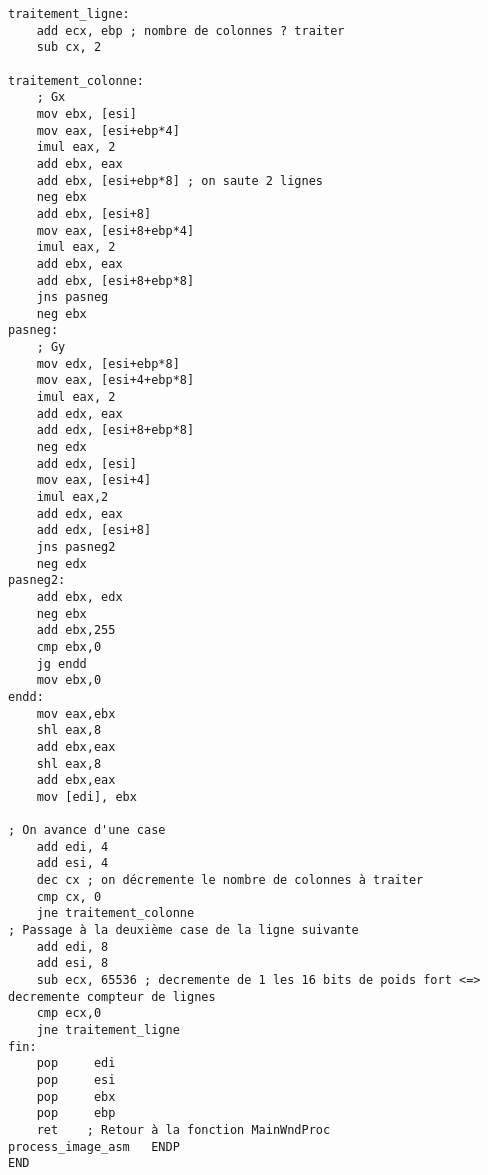 \begin{lstlisting}
traitement_ligne:
    add ecx, ebp ; nombre de colonnes ? traiter
    sub cx, 2

traitement_colonne:
    ; Gx 
    mov ebx, [esi]
    mov eax, [esi+ebp*4]
    imul eax, 2
    add ebx, eax
    add ebx, [esi+ebp*8] ; on saute 2 lignes
    neg ebx
    add ebx, [esi+8]
    mov eax, [esi+8+ebp*4]
    imul eax, 2
    add ebx, eax
    add ebx, [esi+8+ebp*8]
    jns pasneg
    neg ebx
pasneg:
    ; Gy
    mov edx, [esi+ebp*8]
    mov eax, [esi+4+ebp*8]
    imul eax, 2
    add edx, eax
    add edx, [esi+8+ebp*8]
    neg edx
    add edx, [esi]
    mov eax, [esi+4]
    imul eax,2
    add edx, eax
    add edx, [esi+8]
    jns pasneg2
    neg edx
pasneg2:
    add ebx, edx
    neg ebx
    add ebx,255
    cmp ebx,0
    jg endd
    mov ebx,0
endd:
    mov eax,ebx
    shl eax,8
    add ebx,eax
    shl eax,8
    add ebx,eax
    mov [edi], ebx

; On avance d'une case
    add edi, 4
    add esi, 4
    dec cx ; on décremente le nombre de colonnes à traiter
    cmp cx, 0
    jne traitement_colonne
; Passage à la deuxième case de la ligne suivante
    add edi, 8
    add esi, 8
    sub ecx, 65536 ; decremente de 1 les 16 bits de poids fort <=> decremente compteur de lignes
    cmp ecx,0
    jne traitement_ligne
fin:
    pop     edi
    pop     esi
    pop     ebx
    pop     ebp
    ret    ; Retour à la fonction MainWndProc
process_image_asm   ENDP
END
\end{lstlisting}